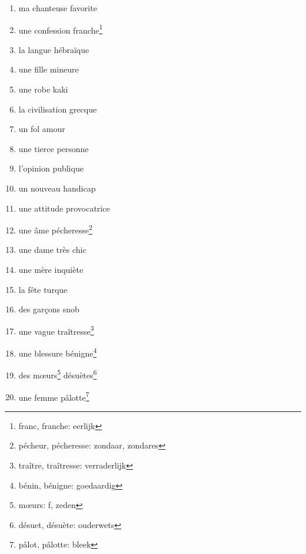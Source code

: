 \documentclass[11pt, french]{report}
\begin{document}
\vfill

\begin{enumerate}
\item ma chanteuse favorite
\item une confession franche\footnote{franc, franche: eerlijk}
\item la langue hébraïque
\item une fille mineure
\item une robe kaki
\item la civilisation grecque
\item un fol amour
\item une tierce personne
\item l'opinion publique
\item un nouveau handicap
\item une attitude provocatrice
\item une âme pécheresse\footnote{pécheur, pécheresse: zondaar, zondares}
\item une dame très chic
\item une mère inquiète
\item la fête turque
\item des garçons snob
\item une vague traîtresse\footnote{traître, traîtresse: verraderlijk}
\item une blessure bénigne\footnote{bénin, bénigne: goedaardig}
\item des mœurs\footnote{mœurs: f, zeden} désuètes\footnote{désuet, désuète: ouderwets}
\item une femme pâlotte\footnote{pâlot, pâlotte: bleek}
\end{enumerate}

\vfill
\end{document}
